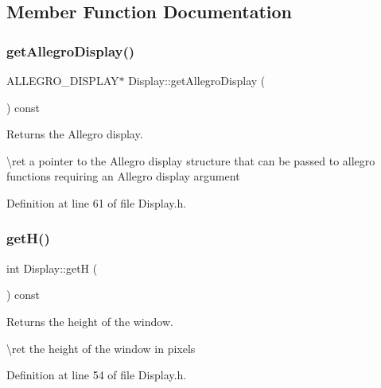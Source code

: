 \subsection{Member Function Documentation}
\mbox{\label{class_display_a800ce141e803ab23b029a6638860ab51}} 
\subsubsection{\texorpdfstring{getAllegroDisplay()}{getAllegroDisplay()}}
{\footnotesize\ttfamily A\+L\+L\+E\+G\+R\+O\+\_\+\+D\+I\+S\+P\+L\+AY$\ast$ Display\+::get\+Allegro\+Display (\begin{DoxyParamCaption}{ }\end{DoxyParamCaption}) const\hspace{0.3cm}{\ttfamily [inline]}}



Returns the Allegro display. 

\textbackslash{}ret a pointer to the Allegro display structure that can be passed to allegro functions requiring an Allegro display argument 

Definition at line 61 of file Display.\+h.


\begin{DoxyCode}{0}

\end{DoxyCode}
\mbox{\label{class_display_a5faae23c211bed34aca048b98e2b9e81}} 
\subsubsection{\texorpdfstring{getH()}{getH()}}
{\footnotesize\ttfamily int Display\+::getH (\begin{DoxyParamCaption}{ }\end{DoxyParamCaption}) const\hspace{0.3cm}{\ttfamily [inline]}}



Returns the height of the window. 

\textbackslash{}ret the height of the window in pixels 

Definition at line 54 of file Display.\+h.


